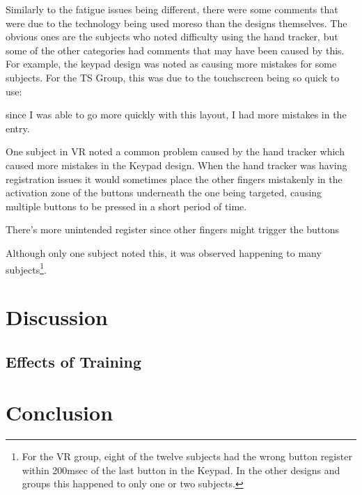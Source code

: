 Similarly to the fatigue issues being different, there were some comments that were due to the technology being used moreso than the designs themselves.
The obvious ones are the subjects who noted difficulty using the hand tracker, but some of the other categories had comments that may have been caused by this.
For example, the keypad design was noted as causing more mistakes for some subjects.
For the TS Group, this was due to the touchscreen being so quick to use:
\begin{displayquote}[TS Subject]
    since I was able to go more quickly with this layout, I had more mistakes in the entry.
\end{displayquote}
One subject in VR noted a common problem caused by the hand tracker which caused more mistakes in the Keypad design.
When the hand tracker was having registration issues it would sometimes place the other fingers mistakenly in the activation zone of the buttons underneath the one being targeted, causing multiple buttons to be pressed in a short period of time.
\begin{displayquote}[VR Subject]
    There's more unintended register since other fingers might trigger the buttons
\end{displayquote}
Although only one subject noted this, it was observed happening to many subjects\footnote{For the VR group, eight of the twelve subjects had the wrong button register within 200msec of the last button in the Keypad. In the other designs and groups this happened to only one or two subjects.}.


\section{Discussion}


\subsection{Effects of Training}


\section{Conclusion}
